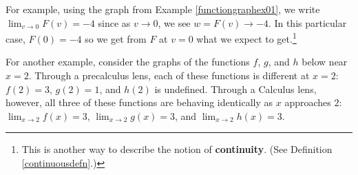 \documentclass{ximera}
\begin{document}
For example, using the graph from Example \ref{functiongraphex01}, we write $\lim_{v \rightarrow 0} F(v) = -4$ since as $v \rightarrow 0$, we see $w = F(v) \rightarrow -4$.  In this particular case, $F(0) = -4$ so we get from $F$ at $v=0$ what we expect to get.\footnote{This is another way to describe the notion of \textbf{continuity}.  (See Definition \ref{continuousdefn}.)}



For another example, consider the graphs of the functions $f$, $g$, and $h$ below near $x = 2$. Through a precalculus lens, each of these functions is different at $x = 2$:   $f(2) = 3$, $g(2) = 1$, and $h(2)$ is undefined.  Through a Calculus lens, however, all three of these functions are behaving identically as  $x$ approaches $2$:   $\lim_{x \rightarrow 2} f(x) = 3$, $ \lim_{x \rightarrow 2} g(x)= 3$, and $\lim_{x \rightarrow 2} h(x) = 3$.
\end{document}
